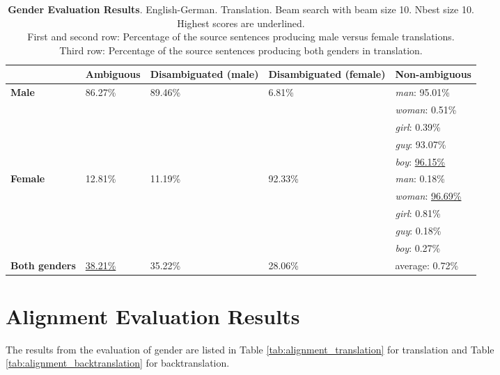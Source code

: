 \begin{table} 
    \label{tab:gender_percent}
    \begin{tabularx}{\linewidth}{|X|XXXX|}
        \hline
         & \textbf{Ambiguous} & \textbf{Disambiguated (male)} & \textbf{Disambiguated (female)} & \textbf{Non-ambiguous} \\ \hline
         \textbf{Male} & 86.27\% & 89.46\% & 6.81\% & \textit{man}: 95.01\% \\
         &&&& \textit{woman}: 0.51\% \\
         &&&& \textit{girl}: 0.39\% \\
         &&&& \textit{guy}: 93.07\% \\
         &&&& \textit{boy}: \underline{96.15\%} \\ \hline
         \textbf{Female} & 12.81\% & 11.19\% & 92.33\% & \textit{man}: 0.18\% \\ 
         &&&& \textit{woman}: \underline{96.69\%} \\
         &&&& \textit{girl}: 0.81\% \\
         &&&& \textit{guy}: 0.18\% \\
         &&&& \textit{boy}: 0.27\% \\\hline
         \textbf{Both genders} & \underline{38.21\%} & 35.22\% & 28.06\% & average: 0.72\% \\ \hline
    \end{tabularx}
    \caption{\textbf{Gender Evaluation Results}. English-German. Translation. Beam search with beam size 10. Nbest size 10. Highest scores are underlined. \\ First and second row: Percentage of the source sentences producing male versus female translations. \\ Third row: Percentage of the source sentences producing both genders in translation.}
\end{table}

\section{Alignment Evaluation Results}
\label{ch:Results:Alignment}

The results from the evaluation of gender are listed in Table \ref{tab:alignment_translation} for translation and Table \ref{tab:alignment_backtranslation} for backtranslation.


